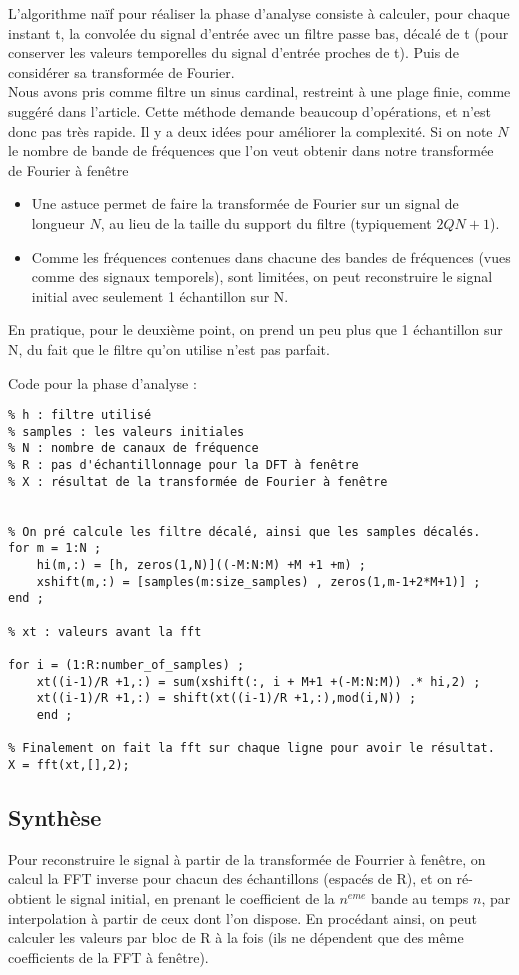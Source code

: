 \documentclass[a4paper,11pt]{article}
\begin{document}
L'algorithme naïf pour réaliser la phase d'analyse consiste à calculer, pour chaque instant t, la convolée du signal d'entrée avec un filtre passe bas, décalé de t (pour conserver les valeurs temporelles du signal d'entrée proches de t). Puis de considérer sa transformée de Fourier.\\
Nous avons pris comme filtre un sinus cardinal, restreint à une plage finie, comme suggéré dans l'article.
Cette méthode demande beaucoup d'opérations, et n'est donc pas très rapide.
Il y a deux idées pour améliorer la complexité. Si on note $N$ le nombre de bande de fréquences que l'on veut obtenir dans notre transformée de Fourier à fenêtre
\begin{itemize}
	\item Une astuce permet de faire la transformée de Fourier sur un signal de longueur $N$, au lieu de la taille du support du filtre (typiquement $2QN+1$).
	\item Comme les fréquences contenues dans chacune des bandes de fréquences (vues comme des signaux temporels), sont limitées, on peut reconstruire le signal initial avec seulement 1 échantillon sur N.
\end{itemize}
En pratique, pour le deuxième point, on prend un peu plus que 1 échantillon sur N, du fait que le filtre qu'on utilise n'est pas parfait. 

Code pour la phase d'analyse : \\
\begin{verbatim}
% h : filtre utilisé
% samples : les valeurs initiales
% N : nombre de canaux de fréquence
% R : pas d'échantillonnage pour la DFT à fenêtre
% X : résultat de la transformée de Fourier à fenêtre


% On pré calcule les filtre décalé, ainsi que les samples décalés.
for m = 1:N ;
    hi(m,:) = [h, zeros(1,N)]((-M:N:M) +M +1 +m) ;
    xshift(m,:) = [samples(m:size_samples) , zeros(1,m-1+2*M+1)] ;
end ;
	
% xt : valeurs avant la fft

for i = (1:R:number_of_samples) ;
    xt((i-1)/R +1,:) = sum(xshift(:, i + M+1 +(-M:N:M)) .* hi,2) ;
    xt((i-1)/R +1,:) = shift(xt((i-1)/R +1,:),mod(i,N)) ; 
    end ;
	
% Finalement on fait la fft sur chaque ligne pour avoir le résultat.
X = fft(xt,[],2); 

\end{verbatim}

\subsection{Synthèse}
Pour reconstruire le signal à partir de la transformée de Fourrier à fenêtre, on calcul la FFT inverse pour chacun des échantillons (espacés de R), et on ré-obtient le signal initial, en prenant le coefficient de la $n^{eme}$ bande au temps $n$, par interpolation à partir de ceux dont l'on dispose. En procédant ainsi, on peut calculer les valeurs par bloc de R à la fois (ils ne dépendent que des même coefficients de la FFT à fenêtre).
\end{document}
